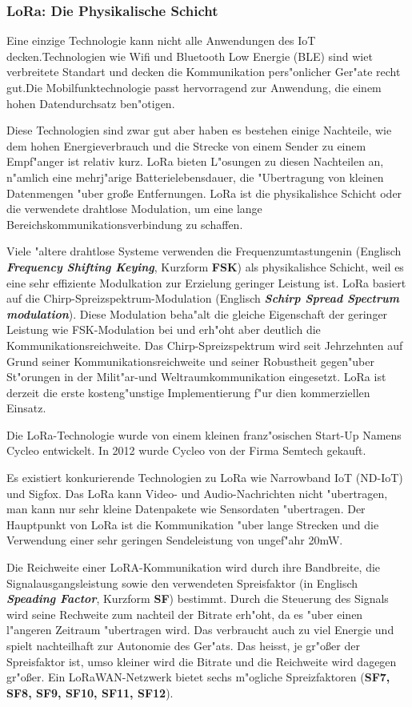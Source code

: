 \subsubsection{LoRa: Die Physikalische Schicht}

Eine einzige Technologie kann nicht alle Anwendungen des IoT 
decken.Technologien wie Wifi und Bluetooth Low Energie (BLE) sind wiet 
verbreitete Standart und decken die Kommunikation pers"onlicher Ger"ate 
recht gut.Die Mobilfunktechnologie passt hervorragend zur Anwendung, 
die einem hohen Datendurchsatz ben"otigen.

Diese Technologien sind zwar gut aber haben es bestehen einige 
Nachteile, wie dem hohen Energieverbrauch und die Strecke von einem 
Sender zu einem Empf"anger ist relativ kurz. LoRa bieten L"osungen zu 
diesen Nachteilen an, n"amlich eine mehrj"arige Batterielebensdauer, 
die "Ubertragung von kleinen Datenmengen "uber gro\ss{}e Entfernungen. 
LoRa ist die physikalishce Schicht oder die verwendete drahtlose 
Modulation, um eine lange Bereichskommunikationsverbindung zu schaffen. 

Viele "altere drahtlose Systeme verwenden die Frequenzumtastungenin 
(Englisch \textbf{\textit{Frequency Shifting Keying}}, Kurzform 
\textbf{FSK}) als physikalishce Schicht, weil es eine sehr effiziente 
Modulkation zur Erzielung geringer Leistung ist. LoRa basiert auf die 
Chirp-Spreizspektrum-Modulation (Englisch \textbf{\textit{Schirp Spread 
Spectrum modulation}}). Diese Modulation beha"alt die gleiche 
Eigenschaft der geringer Leistung wie FSK-Modulation bei und erh"oht 
aber deutlich die Kommunikationsreichweite. Das Chirp-Spreizspektrum 
wird seit Jehrzehnten auf Grund seiner Kommunikationsreichweite und 
seiner Robustheit gegen"uber St"orungen in der Milit"ar-und 
Weltraumkommunikation eingesetzt. LoRa ist derzeit die erste 
kosteng"unstige Implementierung f"ur dien kommerziellen Einsatz.

Die LoRa-Technologie wurde von einem kleinen franz"osischen Start-Up 
Namens Cycleo entwickelt. In 2012 wurde Cycleo von der Firma Semtech 
gekauft.

Es existiert konkurierende Technologien zu LoRa  wie Narrowband IoT 
(ND-IoT) und Sigfox. Das LoRa kann  Video- und Audio-Nachrichten nicht 
"ubertragen, man kann nur sehr kleine Datenpakete wie Sensordaten 
"ubertragen. Der Hauptpunkt von LoRa ist die Kommunikation "uber lange 
Strecken und die Verwendung einer sehr geringen Sendeleistung von 
ungef"ahr 20mW. 

Die Reichweite einer LoRA-Kommunikation wird durch ihre Bandbreite, die 
Signalausgangsleistung sowie den verwendeten Spreisfaktor (in Englisch 
\textbf{\textit{Speading Factor}}, Kurzform \textbf{SF}) bestimmt. 
Durch die Steuerung des Signals wird seine Rechweite zum nachteil der 
Bitrate erh"oht, da es "uber einen l"angeren Zeitraum "ubertragen wird. 
Das verbraucht auch zu viel Energie und spielt nachteilhaft zur 
Autonomie des Ger"ats. Das heisst, je gr"o\ss{}er der Spreisfaktor ist, 
umso kleiner wird die Bitrate und die Reichweite wird dagegen 
gr"o\ss{}er.
Ein LoRaWAN-Netzwerk bietet sechs m"ogliche Spreizfaktoren 
(\textbf{SF7, SF8, SF9, SF10, SF11, SF12}).  

